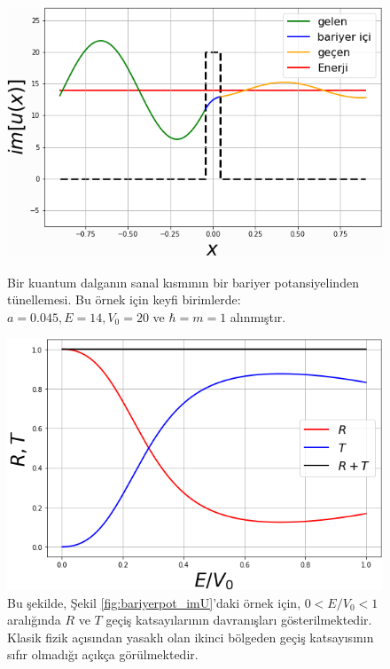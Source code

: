 \documentclass[a4paper,12pt, twoside]{article}
\begin{document}
\begin{figure}[hbtp]
	\begin{minipage}{.48\textwidth}
		\centering
		\includegraphics[width=\linewidth]{figurler/Bariyer_Potansiyeli_imU.png}
		\caption{Bir kuantum dalganın sanal kısmının bir bariyer potansiyelinden tünellemesi. Bu örnek için keyfi birimlerde: $a=0.045, E=14, V_0 = 20$ ve $\hbar = m = 1$ alınmıştır.
		\vspace{12pt}
		}
		\label{fig:bariyerpot_imU}
	\end{minipage}
	\hspace{24pt}
	\begin{minipage}{.48\textwidth}
		\centering
		\includegraphics[width=\linewidth]{figurler/Bariyer_Potansiyeli_TR_EV0.png}
		\caption{Bu şekilde, Şekil \ref{fig:bariyerpot_imU}'daki örnek için, $0<E/V_0<1$ aralığında $R$ ve $T$ geçiş katsayılarının davranışları gösterilmektedir. Klasik fizik açısından yasaklı olan ikinci bölgeden geçiş katsayısının sıfır olmadığı açıkça görülmektedir.}
		\label{fig:bariyerpot_TR}
	\end{minipage}
\end{figure}
\end{document}

